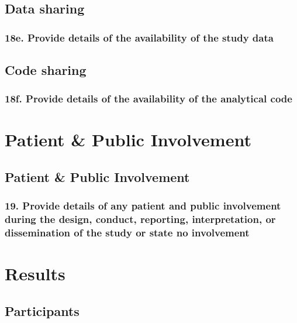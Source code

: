 \documentclass[
  letterpaper,
  DIV=11,
  numbers=noendperiod]{scrartcl}
\begin{document}
\subsection{Data sharing}\label{data-sharing}

\subsubsection{18e. Provide details of the availability of the study
data}\label{e.-provide-details-of-the-availability-of-the-study-data}

\subsection{Code sharing}\label{code-sharing}

\subsubsection{18f. Provide details of the availability of the
analytical
code}\label{f.-provide-details-of-the-availability-of-the-analytical-code}

\section{Patient \& Public
Involvement}\label{patient-public-involvement}

\subsection{Patient \& Public
Involvement}\label{patient-public-involvement-1}

\subsubsection{19. Provide details of any patient and public involvement
during the design, conduct, reporting, interpretation, or dissemination
of the study or state no
involvement}\label{provide-details-of-any-patient-and-public-involvement-during-the-design-conduct-reporting-interpretation-or-dissemination-of-the-study-or-state-no-involvement}

\section{Results}\label{results}

\subsection{Participants}\label{participants-1}
\end{document}
